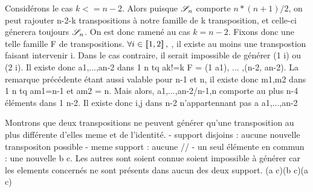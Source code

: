 \documentclass[a4paper]{article}
\newcommand{\fai}[2]{\forall #1 \in #2,\ }
\begin{document}
\pagestyle{fancy}

Considérons le cas \(k<=n-2\). Alors puisque \(\mathscr{S}_{n}\) comporte \(n*(n+1)/2\), on peut rajouter n-2-k transpositions à notre famille de k transposition, et celle-ci génerera toujours \(\mathscr{S}_{n}\). 
On est donc ramené au cas \(k=n-2\). Fixons donc une telle famille F de transpositions. \(\fai{i}{\intent{1}{2}}\), il existe au moins une transpostion faisant intervenir i. Dans le cas contraire, il serait impossible de générer (1 i) ou (2 i). Il existe donc a1,...,an-2 dans 1 n tq ak!=k F = (1 a1), ... ,(n-2, an-2). La remarque précédente étant aussi valable pour n-1 et n, il existe donc m1,m2 dans 1 n tq am1=n-1 et am2 = n. Mais alors, {a1,...,an-2}/{n-1,n} comporte au plus n-4 éléments dans 1 n-2. Il existe donc i,j dans n-2 n'appartennant pas a {a1,...,an-2}

Montrons que deux transpositions ne peuvent générer qu'une transposition au plus différente d'elles meme et de l'identité.
- support disjoins : aucune nouvelle transpositon possible 
- meme support : aucune // 
- un seul élémente en commun : une nouvelle b c. Les autres sont soient connue soient impossible à générer car les elements concernés ne sont présents dans aucun des deux support. (a c)(b c)(a c)
\end{document}
